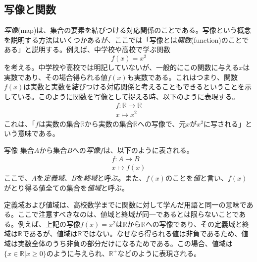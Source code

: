 \subsection{写像と関数}
\emph{写像}(map)は、集合の要素を結びつける対応関係のことである。写像という概念を説明する方法はいくつかあるが、ここでは「写像とは\emph{関数}(function)のことである」と説明する。例えば、中学校や高校で学ぶ関数
\begin{equation}
	f(x)=x^2
\end{equation}
を考える。中学校や高校では明記していないが、一般的にこの関数に与える\(x\)は実数であり、その場合得られる値\(f(x)\)も実数である。これはつまり、関数\(f(x)\)は実数と実数を結びつける対応関係と考えることもできるということを示している。このように関数を写像として捉える時、以下のように表現する。
\begin{equation}
	\begin{aligned}
		f: \mathbb{R}\rightarrow \mathbb{R} \\
		x\longmapsto x^2
	\end{aligned}
\end{equation}
これは、「\(f\)は実数の集合\(\mathbb{R}\)から実数の集合\(\mathbb{R}\)への写像で、元\(x\)が\(x^2\)に写される」という意味である。
\begin{definition*}{写像}
	集合\(A\)から集合\(B\)への\emph{写像}\(f\)は、以下のように表される。
	\begin{equation}
		\begin{aligned}
			f: A\rightarrow B \\
			x\longmapsto f(x)
		\end{aligned}
	\end{equation}
	ここで、\(A\)を\emph{定義域}、\(B\)を\emph{終域}と呼ぶ。また、\(f(x)\)のことを\emph{値}と言い、\(f(x)\)がとり得る値全ての集合を\emph{値域}と呼ぶ。
\end{definition*}
定義域および値域は、高校数学までに関数に対して学んだ用語と同一の意味である。ここで注意すべきなのは、値域と終域が同一であるとは限らないことである。例えば、上記の写像\(f(x)=x^2\)は\(\mathbb{R}\)から\(\mathbb{R}\)への写像であり、その定義域と終域は\(\mathbb{R}\)であるが、値域は\(\mathbb{R}\)ではない。なぜなら得られる値は非負であるため、値域は実数全体のうち非負の部分だけになるためである。この場合、値域は\(\{x\in \mathbb{R}|x\geq0\}\)のように与えられ、\(\mathbb{R}^+\)などのように表現される。

